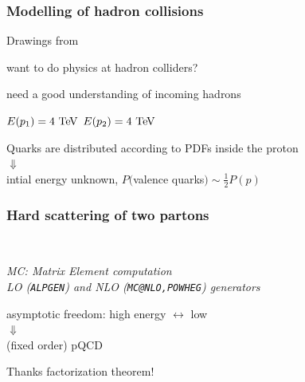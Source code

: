 

\begin{frame}\frametitle{Modelling of hadron collisions}
\small\centering

\begin{flushright}\tiny Drawings from~\cite{Gieseke}\end{flushright}

want to do physics at hadron colliders?

need a good understanding of incoming hadrons

\myskip
\myskip


$E(p_1)=4\tev$ \hspace{.3\paperwidth} $E(p_2)=4\tev$

\vspace{.3\paperheight}

Quarks are distributed according to PDFs inside the proton\\
{\LARGE $\Downarrow$}\\
intial energy unknown, $P($valence quarks$)\sim \frac{1}{2}P(p)$

\end{frame}


\begin{frame}\frametitle{Hard scattering of two partons}
\centering\myskip

\begin{minipage}{.25\textwidth}\centering
$\quad$
\end{minipage}\begin{minipage}{.7\textwidth}\centering
\begin{flushright}\footnotesize {\it MC: Matrix Element computation\\\myskip LO (\texttt{ALPGEN}) and NLO (\texttt{MC@NLO,POWHEG}) generators}
\end{flushright}
\end{minipage}


\vspace{.42\paperheight}

{\cccolor asymptotic freedom}: high energy $\longleftrightarrow$ low \alphas\\
{\LARGE $\Downarrow$}\\
(fixed order) pQCD

\begin{flushright}\scriptsize Thanks {\cccolor factorization theorem}!
\end{flushright}

\end{frame}

